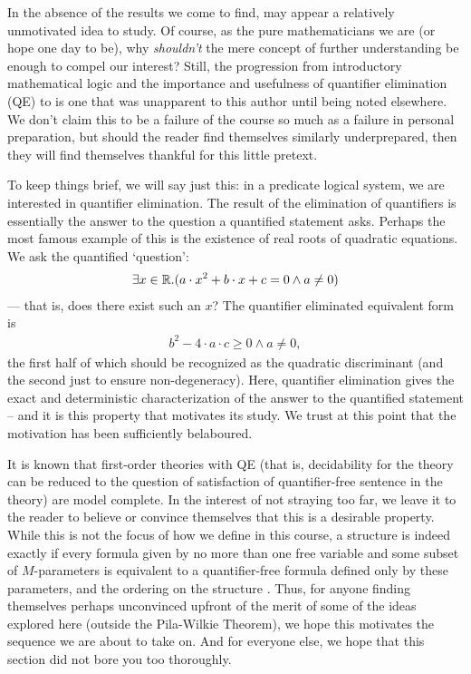 In the absence of the results we come to find, \omy may appear a relatively unmotivated idea to study. Of course, as the pure mathematicians we are (or hope one day to be), why \emph{shouldn't} the mere concept of further understanding be enough to compel our interest? Still, the progression from introductory mathematical logic and the importance and usefulness of quantifier elimination (QE) to \omy is one that was unapparent to this author until being noted elsewhere. We don't claim this to be a failure of the course so much as a failure in personal preparation, but should the reader find themselves similarly underprepared, then they will find themselves thankful for this little pretext.

To keep things brief, we will say just this: in a predicate logical system, we are interested in quantifier elimination. The result of the elimination of quantifiers is essentially the answer to the question a quantified statement asks. Perhaps the most famous example of this is the existence of real roots of quadratic equations. We ask the quantified `question':
\begin{align}
  \exists x \in \mathbb{R} . (a \cdot x^2 + b \cdot x + c = 0 \wedge a \neq 0)
\end{align}
— that is, does there exist such an $x$? The quantifier eliminated equivalent form is
\begin{align}
  b^2 - 4 \cdot a \cdot c \geq 0 \wedge a \neq 0,
\end{align}
the first half of which should be recognized as the quadratic discriminant (and the second just to ensure non-degeneracy). Here, quantifier elimination gives the exact and deterministic characterization of the answer to the quantified statement -- and it is this property that motivates its study. We trust at this point that the motivation has been sufficiently belaboured.

It is known that first-order theories with QE (that is, decidability for the theory can be reduced to the question of satisfaction of quantifier-free sentence in the theory) are model complete. In the interest of not straying too far, we leave it to the reader to believe or convince themselves that this is a desirable property. While this is not the focus of how we define \omy in this course, a structure is indeed \om exactly if every formula given by no more than one free variable and some subset of $M$-parameters is equivalent to a quantifier-free formula defined only by these parameters, and the ordering on the structure \cite{marker_model_2002}. Thus, for anyone finding themselves perhaps unconvinced upfront of the merit of some of the ideas explored here (outside the Pila-Wilkie Theorem), we hope this motivates the sequence we are about to take on. And for everyone else, we hope that this section did not bore you too thoroughly.



